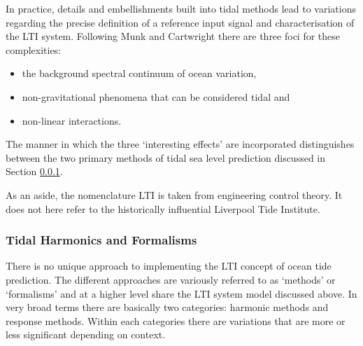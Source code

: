 In practice, details and embellishments built into tidal methods lead to variations regarding the precise definition of a reference input signal and characterisation of the LTI system.   Following Munk and Cartwright \citep{Munk:1966ts} there are three foci for these complexities:
\begin{itemize}
\item the background spectral continuum of ocean variation, 
\item non-gravitational phenomena that can be considered tidal and 
\item non-linear interactions.   
\end{itemize}
The manner in which the three `interesting effects' are incorporated distinguishes between the two primary methods of tidal sea level prediction discussed in Section \ref{S:formalisms}.



As an aside, the nomenclature LTI is taken from engineering control theory.   It does not here refer to the historically influential Liverpool Tide Institute.


\subsubsection{Tidal Harmonics and Formalisms}
\label{S:formalisms}

There is no unique approach to implementing the LTI concept of ocean tide prediction.   The different approaches are variously referred to as `methods' or `formalisms' and at a higher level share the LTI system model discussed above.  In very broad terms there are basically two categories: harmonic methods and response methods.   Within each categories there are variations that are more or less significant depending on context. 



